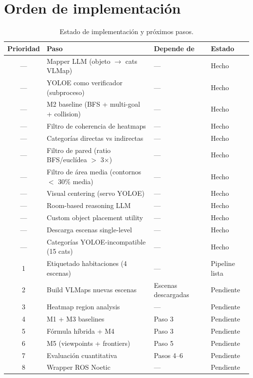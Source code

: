 \documentclass[11pt,a4paper]{article}
\begin{document}
\section{Orden de implementación}

\begin{table}[h]
\centering
\begin{tabular}{clll}
\toprule
\textbf{Prioridad} & \textbf{Paso} & \textbf{Depende de} & \textbf{Estado} \\
\midrule
--- & Mapper LLM (objeto $\rightarrow$ cats VLMap) & --- & \textcolor{done}{Hecho} \\
--- & YOLOE como verificador (subproceso) & --- & \textcolor{done}{Hecho} \\
--- & M2 baseline (BFS + multi-goal + collision) & --- & \textcolor{done}{Hecho} \\
--- & Filtro de coherencia de heatmaps & --- & \textcolor{done}{Hecho} \\
--- & Categorías directas vs indirectas & --- & \textcolor{done}{Hecho} \\
--- & Filtro de pared (ratio BFS/euclídea $>$ 3$\times$) & --- & \textcolor{done}{Hecho} \\
--- & Filtro de área media (contornos $<$ 30\% media) & --- & \textcolor{done}{Hecho} \\
--- & Visual centering (servo YOLOE) & --- & \textcolor{done}{Hecho} \\
--- & Room-based reasoning LLM & --- & \textcolor{done}{Hecho} \\
--- & Custom object placement utility & --- & \textcolor{done}{Hecho} \\
--- & Descarga escenas single-level & --- & \textcolor{done}{Hecho} \\
--- & Categorías YOLOE-incompatible (15 cats) & --- & \textcolor{done}{Hecho} \\
\midrule
1 & Etiquetado habitaciones (4 escenas) & --- & \textcolor{partial}{Pipeline lista} \\
2 & Build VLMaps nuevas escenas & Escenas descargadas & \textcolor{notdone}{Pendiente} \\
3 & Heatmap region analysis & --- & \textcolor{notdone}{Pendiente} \\
4 & M1 + M3 baselines & Paso 3 & \textcolor{notdone}{Pendiente} \\
5 & Fórmula híbrida + M4 & Paso 3 & \textcolor{notdone}{Pendiente} \\
6 & M5 (viewpoints + frontiers) & Paso 5 & \textcolor{notdone}{Pendiente} \\
7 & Evaluación cuantitativa & Pasos 4--6 & \textcolor{notdone}{Pendiente} \\
8 & Wrapper ROS Noetic & --- & \textcolor{notdone}{Pendiente} \\
\bottomrule
\end{tabular}
\caption{Estado de implementación y próximos pasos.}
\end{table}
\end{document}
